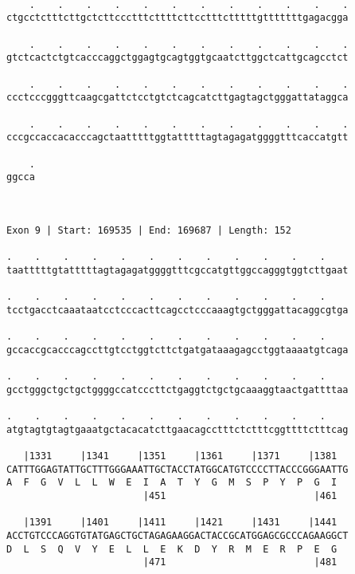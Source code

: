 \documentclass{article}
\begin{document}
\begin{Verbatim}
  
    .    .    .    .    .    .    .    .    .    .    .    .
ctgcctctttcttgctcttccctttcttttcttcctttctttttgtttttttgagacgga
                                                            
    .    .    .    .    .    .    .    .    .    .    .    .
gtctcactctgtcacccaggctggagtgcagtggtgcaatcttggctcattgcagcctct
                                                            
    .    .    .    .    .    .    .    .    .    .    .    .
ccctcccgggttcaagcgattctcctgtctcagcatcttgagtagctgggattataggca
                                                            
    .    .    .    .    .    .    .    .    .    .    .    .
cccgccaccacacccagctaatttttggtatttttagtagagatggggtttcaccatgtt
                                                            
    .
ggcca
     
     
 
Exon 9 | Start: 169535 | End: 169687 | Length: 152
 
.    .    .    .    .    .    .    .    .    .    .    .    
taatttttgtatttttagtagagatggggtttcgccatgttggccagggtggtcttgaat
                                                            
.    .    .    .    .    .    .    .    .    .    .    .    
tcctgacctcaaataatcctcccacttcagcctcccaaagtgctgggattacaggcgtga
                                                            
.    .    .    .    .    .    .    .    .    .    .    .    
gccaccgcacccagccttgtcctggtcttctgatgataaagagcctggtaaaatgtcaga
                                                            
.    .    .    .    .    .    .    .    .    .    .    .    
gcctgggctgctgctggggccatcccttctgaggtctgctgcaaaggtaactgattttaa
                                                            
.    .    .    .    .    .    .    .    .    .    .    .    
atgtagtgtagtgaaatgctacacatcttgaacagcctttctctttcggttttctttcag
                                                            
   |1331     |1341     |1351     |1361     |1371     |1381  
CATTTGGAGTATTGCTTTGGGAAATTGCTACCTATGGCATGTCCCCTTACCCGGGAATTG
A  F  G  V  L  L  W  E  I  A  T  Y  G  M  S  P  Y  P  G  I  
                        |451                          |461  
  
   |1391     |1401     |1411     |1421     |1431     |1441  
ACCTGTCCCAGGTGTATGAGCTGCTAGAGAAGGACTACCGCATGGAGCGCCCAGAAGGCT
D  L  S  Q  V  Y  E  L  L  E  K  D  Y  R  M  E  R  P  E  G  
                        |471                          |481  
  

\end{Verbatim}
\end{document}
